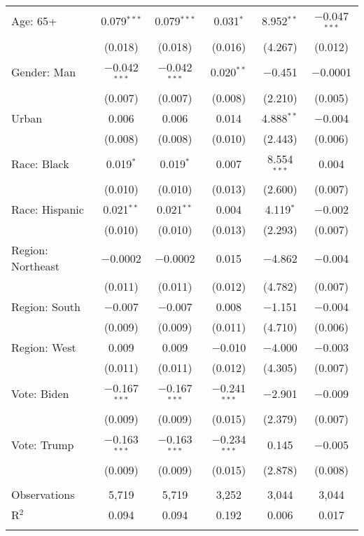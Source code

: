 \begin{tabular}{@{\extracolsep{5pt}}lccccc}
  Age: 65+ & 0.079$^{***}$ & 0.079$^{***}$ & 0.031$^{*}$ & 8.952$^{**}$ & $-$0.047$^{***}$ \\ 
  & (0.018) & (0.018) & (0.016) & (4.267) & (0.012) \\ 
  Gender: Man & $-$0.042$^{***}$ & $-$0.042$^{***}$ & 0.020$^{**}$ & $-$0.451 & $-$0.0001 \\ 
  & (0.007) & (0.007) & (0.008) & (2.210) & (0.005) \\ 
  Urban & 0.006 & 0.006 & 0.014 & 4.888$^{**}$ & $-$0.004 \\ 
  & (0.008) & (0.008) & (0.010) & (2.443) & (0.006) \\ 
  Race: Black & 0.019$^{*}$ & 0.019$^{*}$ & 0.007 & 8.554$^{***}$ & 0.004 \\ 
  & (0.010) & (0.010) & (0.013) & (2.600) & (0.007) \\ 
  Race: Hispanic & 0.021$^{**}$ & 0.021$^{**}$ & 0.004 & 4.119$^{*}$ & $-$0.002 \\ 
  & (0.010) & (0.010) & (0.013) & (2.293) & (0.007) \\ 
  Region: Northeast & $-$0.0002 & $-$0.0002 & 0.015 & $-$4.862 & $-$0.004 \\ 
  & (0.011) & (0.011) & (0.012) & (4.782) & (0.007) \\ 
  Region: South & $-$0.007 & $-$0.007 & 0.008 & $-$1.151 & $-$0.004 \\ 
  & (0.009) & (0.009) & (0.011) & (4.710) & (0.006) \\ 
  Region: West & 0.009 & 0.009 & $-$0.010 & $-$4.000 & $-$0.003 \\ 
  & (0.011) & (0.011) & (0.012) & (4.305) & (0.007) \\ 
  Vote: Biden & $-$0.167$^{***}$ & $-$0.167$^{***}$ & $-$0.241$^{***}$ & $-$2.901 & $-$0.009 \\ 
  & (0.009) & (0.009) & (0.015) & (2.379) & (0.007) \\ 
  Vote: Trump & $-$0.163$^{***}$ & $-$0.163$^{***}$ & $-$0.234$^{***}$ & 0.145 & $-$0.005 \\ 
  & (0.009) & (0.009) & (0.015) & (2.878) & (0.008) \\ 
 \hline \\[-1.8ex] 

Observations & 5,719 & 5,719 & 3,252 & 3,044 & 3,044 \\ 
R$^{2}$ & 0.094 & 0.094 & 0.192 & 0.006 & 0.017 \\ 
\hline 
\hline \\[-1.8ex] 
\end{tabular} 